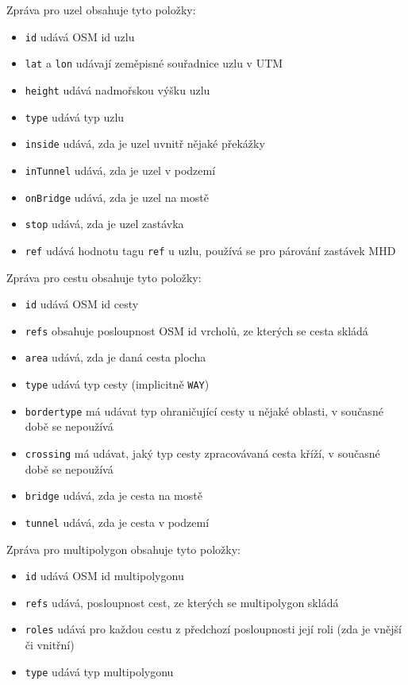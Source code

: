 Zpráva pro uzel obsahuje tyto položky:
\begin{itemize}
	\item {\tt id} udává OSM id uzlu 
	\item {\tt lat} a {\tt lon} udávají zeměpisné souřadnice uzlu v UTM
	\item {\tt height} udává nadmořskou výšku uzlu
	\item {\tt type} udává typ uzlu
	\item {\tt inside} udává, zda je uzel uvnitř nějaké překážky
	\item {\tt inTunnel} udává, zda je uzel v podzemí
	\item {\tt onBridge} udává, zda je uzel na mostě
	\item {\tt stop} udává, zda je uzel zastávka
	\item {\tt ref} udává hodnotu tagu {\tt ref} u uzlu, používá se pro
	párování zastávek MHD
\end{itemize}  
Zpráva pro cestu obsahuje tyto položky:
\begin{itemize}
	\item {\tt id} udává OSM id cesty
	\item {\tt refs} obsahuje posloupnost OSM id vrcholů, ze kterých se
	cesta skládá
	\item {\tt area} udává, zda je daná cesta plocha 
	\item {\tt type} udává typ cesty (implicitně {\tt WAY}) 
	\item {\tt bordertype} má udávat typ ohraničující cesty u nějaké
	oblasti, v současné době se nepoužívá
	\item {\tt crossing} má udávat, jaký typ cesty zpracovávaná cesta kříží,
	v současné době se nepoužívá  
	\item {\tt bridge} udává, zda je cesta na mostě
	\item {\tt tunnel} udává, zda je cesta v podzemí
\end{itemize} 
Zpráva pro multipolygon obsahuje tyto položky:
\begin{itemize}
	\item {\tt id} udává OSM id multipolygonu
	\item {\tt refs} udává, posloupnost cest, ze kterých se multipolygon
	skládá
	\item {\tt roles} udává pro každou cestu z předchozí posloupnosti její
	roli (zda je vnější či vnitřní)
	\item {\tt type} udává typ multipolygonu
\end{itemize}  
